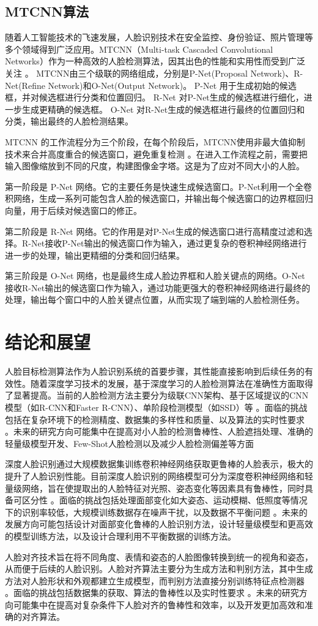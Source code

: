\documentclass[a4paper]{article}
\begin{document}
\subsection{MTCNN算法}

随着人工智能技术的飞速发展，人脸识别技术在安全监控、身份验证、照片管理等多个领域得到广泛应用。MTCNN（Multi-task Cascaded Convolutional Networks）作为一种高效的人脸检测算法，因其出色的性能和实用性而受到广泛关注\cite{zhang2019multi} \cite{li2020face} \cite{zou2020multi}。
MTCNN由三个级联的网络组成，分别是P-Net(Proposal Network)、R-Net(Refine Network)和O-Net(Output Network)。
P-Net 用于生成初始的候选框，并对候选框进行分类和位置回归。
R-Net 对P-Net生成的候选框进行细化，进一步生成更精确的候选框。
O-Net 对R-Net生成的候选框进行最终的位置回归和分类，输出最终的人脸检测结果。

MTCNN 的工作流程分为三个阶段，在每个阶段后，MTCNN使用非最大值抑制技术来合并高度重合的候选窗口，避免重复检测
。在进入工作流程之前，需要把输入图像缩放到不同的尺度，构建图像金字塔。这是为了应对不同大小的人脸。

第一阶段是 P-Net 网络。它的主要任务是快速生成候选窗口。P-Net利用一个全卷积网络，生成一系列可能包含人脸的候选窗口，并输出每个候选窗口的边界框回归向量，用于后续对候选窗口的修正。

第二阶段是 R-Net 网络。它的作用是对P-Net生成的候选窗口进行高精度过滤和选择。R-Net接收P-Net输出的候选窗口作为输入，通过更复杂的卷积神经网络进行进一步的处理，输出更精细的分类和回归结果。

第三阶段是 O-Net 网络，也是最终生成人脸边界框和人脸关键点的网络。O-Net接收R-Net输出的候选窗口作为输入，通过功能更强大的卷积神经网络进行最终的处理，输出每个窗口中的人脸关键点位置，从而实现了端到端的人脸检测任务。

\section{结论和展望}

人脸目标检测算法作为人脸识别系统的首要步骤，其性能直接影响到后续任务的有效性。随着深度学习技术的发展，基于深度学习的人脸检测算法在准确性方面取得了显著提高。当前的人脸检测方法主要分为级联CNN架构、基于区域提议的CNN模型（如R-CNN和Faster R-CNN）、单阶段检测模型（如SSD）等
。面临的挑战包括在复杂环境下的检测精度、数据集的多样性和质量、以及算法的实时性要求
。未来的研究方向可能集中在提高对小人脸的检测鲁棒性、人脸遮挡处理、准确的轻量级模型开发、Few-Shot人脸检测以及减少人脸检测偏差等方面

深度人脸识别通过大规模数据集训练卷积神经网络获取更鲁棒的人脸表示，极大的提升了人脸识别性能。目前深度人脸识别的网络模型可分为深度卷积神经网络和轻量级网络，旨在使提取出的人脸特征对光照、姿态变化等因素具有鲁棒性，同时具备可区分性
。面临的挑战包括处理面部变化如大姿态、运动模糊、低照度等情况下的识别率较低，大规模训练数据存在噪声干扰，以及数据不平衡问题
。未来的发展方向可能包括设计对面部变化鲁棒的人脸识别方法，设计轻量级模型和更高效的模型训练方法，以及设计合理利用不平衡数据的训练方法。


人脸对齐技术旨在将不同角度、表情和姿态的人脸图像转换到统一的视角和姿态，从而便于后续的人脸识别。人脸对齐算法主要分为生成方法和判别方法，其中生成方法对人脸形状和外观都建立生成模型，而判别方法直接分别训练特征点检测器
。面临的挑战包括数据集的获取、算法的鲁棒性以及实时性要求
。未来的研究方向可能集中在提高对复杂条件下人脸对齐的鲁棒性和效率，以及开发更加高效和准确的对齐算法。

\renewcommand{\refname}{参考文献}


\end{document}
